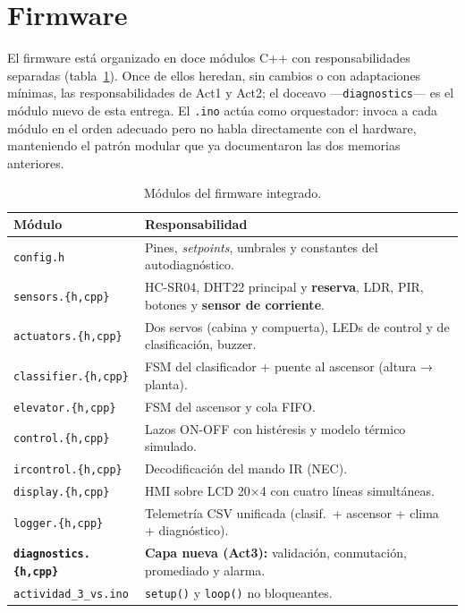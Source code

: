 \section{Firmware}
\label{sec:firmware}

El firmware está organizado en doce módulos C++ con responsabilidades
separadas (tabla~\ref{tab:modulos}). Once de ellos heredan, sin cambios o con
adaptaciones mínimas, las responsabilidades de Act1 y Act2; el doceavo
---\texttt{diagnostics}--- es el módulo nuevo de esta entrega. El
\texttt{.ino} actúa como orquestador: invoca a cada módulo en el orden
adecuado pero no habla directamente con el hardware, manteniendo el patrón
modular que ya documentaron las dos memorias anteriores.

\begin{table}[H]
  \centering
  \small
  \begin{tabular}{p{} p{}}
    \toprule
    \textbf{Módulo} & \textbf{Responsabilidad} \\
    \midrule
    \texttt{config.h}                & Pines, \emph{setpoints}, umbrales y constantes del autodiagnóstico. \\
    \texttt{sensors.\{h,cpp\}}       & HC-SR04, DHT22 principal y \textbf{reserva}, LDR, PIR, botones y \textbf{sensor de corriente}. \\
    \texttt{actuators.\{h,cpp\}}     & Dos servos (cabina y compuerta), LEDs de control y de clasificación, buzzer. \\
    \texttt{classifier.\{h,cpp\}}    & FSM del clasificador + puente al ascensor (altura → planta). \\
    \texttt{elevator.\{h,cpp\}}      & FSM del ascensor y cola FIFO. \\
    \texttt{control.\{h,cpp\}}       & Lazos ON-OFF con histéresis y modelo térmico simulado. \\
    \texttt{ircontrol.\{h,cpp\}}     & Decodificación del mando IR (NEC). \\
    \texttt{display.\{h,cpp\}}       & HMI sobre LCD 20×4 con cuatro líneas simultáneas. \\
    \texttt{logger.\{h,cpp\}}        & Telemetría CSV unificada (clasif.\ + ascensor + clima + diagnóstico). \\
    \texttt{\textbf{diagnostics.\{h,cpp\}}} & \textbf{Capa nueva (Act3):} validación, conmutación, promediado y alarma. \\
    \texttt{actividad\_3\_vs.ino}    & \texttt{setup()} y \texttt{loop()} no bloqueantes. \\
    \bottomrule
  \end{tabular}
  \caption{Módulos del firmware integrado.}
  \label{tab:modulos}
\end{table}

